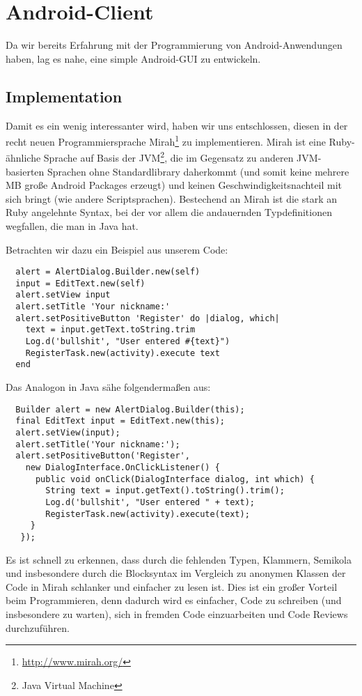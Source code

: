 \documentclass[12pt, a4paper]{scrartcl}
\begin{document}
\clearpage

\section{Android-Client}

Da wir bereits Erfahrung mit der Programmierung von Android-Anwendungen haben,
lag es nahe, eine simple Android-GUI zu entwickeln.

\subsection{Implementation}

Damit es ein wenig interessanter wird, haben wir uns entschlossen, diesen in
der recht neuen Programmiersprache Mirah\footnote{\url{http://www.mirah.org/}}
zu implementieren. Mirah ist eine Ruby-ähnliche Sprache auf Basis der
JVM\footnote{Java Virtual Machine}, die im Gegensatz zu anderen JVM-basierten
Sprachen ohne Standardlibrary daherkommt (und somit keine mehrere MB große
Android Packages erzeugt) und keinen Geschwindigkeitsnachteil mit sich bringt
(wie andere Scriptsprachen). Bestechend an Mirah ist die stark an Ruby
angelehnte Syntax, bei der vor allem die andauernden Typdefinitionen wegfallen,
die man in Java hat.
\np

Betrachten wir dazu ein Beispiel aus unserem Code:
\begin{verbatim}
  alert = AlertDialog.Builder.new(self)
  input = EditText.new(self)
  alert.setView input
  alert.setTitle 'Your nickname:'
  alert.setPositiveButton 'Register' do |dialog, which|
    text = input.getText.toString.trim
    Log.d('bullshit', "User entered #{text}")
    RegisterTask.new(activity).execute text
  end
\end{verbatim}

Das Analogon in Java sähe folgendermaßen aus:
\begin{verbatim}
  Builder alert = new AlertDialog.Builder(this);
  final EditText input = EditText.new(this);
  alert.setView(input);
  alert.setTitle('Your nickname:');
  alert.setPositiveButton('Register',
    new DialogInterface.OnClickListener() {
      public void onClick(DialogInterface dialog, int which) {
        String text = input.getText().toString().trim();
        Log.d('bullshit', "User entered " + text);
        RegisterTask.new(activity).execute(text);
     }
   });
\end{verbatim}

Es ist schnell zu erkennen, dass durch die fehlenden Typen, Klammern, Semikola
und insbesondere durch die Blocksyntax im Vergleich zu anonymen Klassen der
Code in Mirah schlanker und einfacher zu lesen ist. Dies ist ein großer Vorteil
beim Programmieren, denn dadurch wird es einfacher, Code zu schreiben (und
insbesondere zu warten), sich in fremden Code einzuarbeiten und Code Reviews
durchzuführen.
\end{document}
